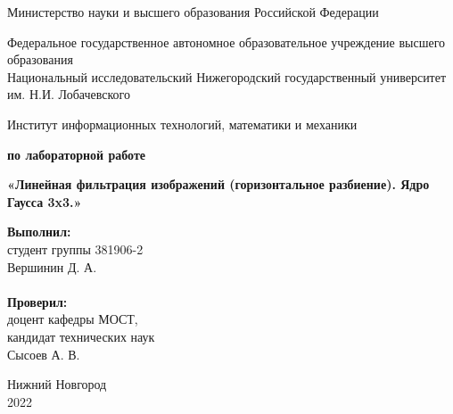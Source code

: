 \documentclass{report}
\begin{document}
\begin{titlepage}

\begin{center}
Министерство науки и высшего образования Российской Федерации
\end{center}

\begin{center}
Федеральное государственное автономное образовательное учреждение высшего образования \\
Национальный исследовательский Нижегородский государственный университет им. Н.И. Лобачевского
\end{center}

\begin{center}
Институт информационных технологий, математики и механики
\end{center}

\vspace{4em}

\begin{center}
\textbf{ по лабораторной работе} \\
\end{center}
\begin{center}
\textbf{\Large«Линейная фильтрация изображений (горизонтальное разбиение). Ядро Гаусса 3x3.»} \\
\end{center}

\vspace{4em}

\newbox{\lbox}
\newlength{\maxl}
\setlength{\maxl}{\wd\lbox}
\hfill\parbox{7cm}{
\hspace*{5cm}\hspace*{-5cm}\textbf{Выполнил:} \\ студент группы 381906-2 \\ Вершинин Д. А. \\
\\
\hspace*{5cm}\hspace*{-5cm}\textbf{Проверил:}\\ доцент кафедры МОСТ, \\ кандидат технических наук \\ Сысоев А. В.\\
}
\vspace{\fill}

\begin{center} Нижний Новгород \\ 2022 \end{center}

\end{titlepage}
\end{document}
